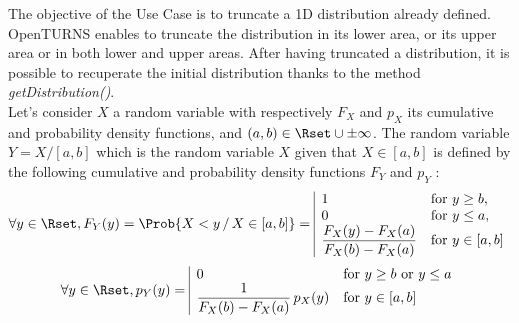 \renewcommand{\filename}{docUC_InputNoData_TruncatedDist.tex}
\renewcommand{\filetitle}{UC : Creation of a truncated distribution}

\HeaderIIILevel
\label{truncatedistribution}





The objective of the Use Case is to truncate a 1D distribution already defined. OpenTURNS enables to truncate the distribution in its lower area, or its upper area or in both lower and upper areas. After having  truncated a distribution, it is possible to recuperate the initial distribution thanks to the method {\itshape getDistribution()}.\\

Let's consider $X$ a random variable with respectively $F_X$ and $p_X$ its cumulative and probability density functions, and $(a,b)\in \Rset \cup {\pm \infty}$. The random variable $Y=X/[a,b]$ which is the random variable $X$ given that $X\in[a,b]$ is defined by the following cumulative and probability density functions $F_Y$ and $p_Y$ :
\begin{align*}
  \forall y \in \Rset, F_Y(y) = \Prob{X<y\, / \, X\in[a,b]} =
  \begin{array}{|ll}
    1 & \mbox{for } y \geq b, \\
    0 & \mbox{for } y \leq a, \\
    \displaystyle \frac{F_X(y) - F_X(a)}{F_X(b) - F_X(a)} & \mbox{for } y\in[a,b]
  \end{array}
\end{align*}
\begin{align*}
  \forall y \in \Rset, p_Y(y) =
  \begin{array}{|ll}
    0 &  \mbox{for } y \geq b  \mbox{ or }  y \leq a\\
    \displaystyle \frac{1}{F_X(b) - F_X(a)}\, p_X(y) & \mbox{for } y\in[a,b]
  \end{array}
\end{align*}





